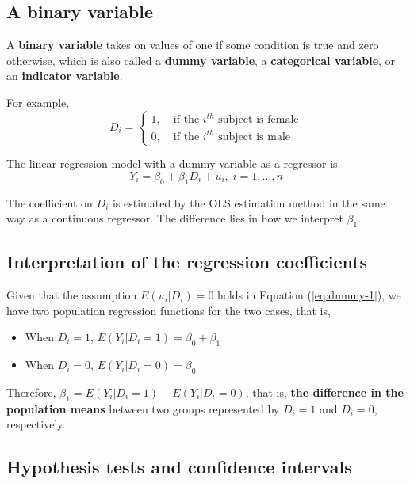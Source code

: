 \documentclass[a4paper,11pt]{article}
\begin{document}
\subsection{A binary variable}
\label{sec:org12da760}

A \textbf{binary variable} takes on values of one if some condition is true
and zero otherwise, which is also called a \textbf{dummy variable}, a
\textbf{categorical variable}, or an \textbf{indicator variable}.

For example, 
\begin{equation*}
D_i = 
\begin{cases}
1,\; &\text{if the } i^{th} \text{ subject is female} \\
0,\; &\text{if the } i^{th} \text{ subject is male} 
\end{cases}
\end{equation*}

The linear regression model with a dummy variable as a regressor is
\begin{equation}
\label{eq:dummy-1}
Y_i = \beta_0 + \beta_1 D_i + u_i,\; i = 1, \ldots, n
\end{equation}

The coefficient on \(D_i\) is estimated by the OLS estimation method
in the same way as a continuous regressor. The difference lies in how
we interpret \(\beta_1\). 


\subsection{Interpretation of the regression coefficients}
\label{sec:orgacaae3b}

Given that the assumption \(E(u_i | D_i) = 0\) holds in Equation
(\ref{eq:dummy-1}), we have two population regression functions for
the two cases, that is,
\begin{itemize}
\item When \(D_i = 1\), \(E(Y_i|D_i = 1) = \beta_0 + \beta_1\)
\item When \(D_i = 0\), \(E(Y_i|D_i = 0) = \beta_0\)
\end{itemize}

Therefore, \(\beta_1 = E(Y_i | D_i = 1) - E(Y_i |D_i = 0)\), that is,
\textbf{the difference in the population means} between two groups represented by
\(D_i = 1\) and \(D_i = 0\), respectively.


\subsection{Hypothesis tests and confidence intervals}
\label{sec:orgbfeecf5}
\end{document}
